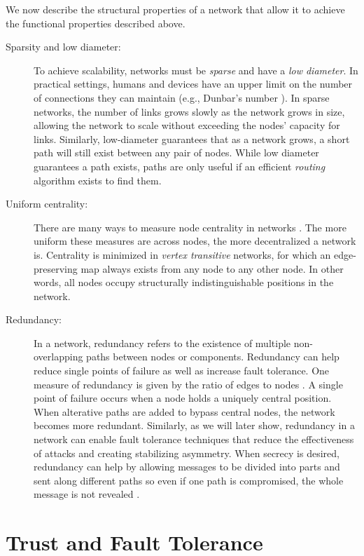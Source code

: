\documentclass{sig-alternate-05-2015}
\begin{document}
We now describe the structural properties of a network that allow it to achieve the functional properties described above. 
\begin{description}
\item [Sparsity and low diameter:]
To achieve scalability, networks must be {\em sparse} and have a
{\em low diameter}.
In practical settings, humans and devices have an upper limit on the number
of connections they can maintain (e.g., Dunbar's number
\cite{dunbar_neocortex_1992}).
In sparse networks, the number of links grows slowly as the network grows in
size, allowing the network to scale without exceeding the nodes' capacity for
links.
Similarly, low-diameter guarantees that as a network grows, a short path will
still exist between any pair of nodes.
While low diameter guarantees a path exists,
paths are only useful if an efficient {\em routing} algorithm exists
to find them.

\item [Uniform centrality:]
There are many ways to measure node centrality in networks
\cite{freeman_centrality_1978}.
The more uniform these measures are across nodes, the more decentralized
a network is.
Centrality is minimized in {\em vertex transitive} networks,
for which an edge-preserving map
always exists from any node to any other node.
In other words, all nodes occupy structurally indistinguishable positions
in the network.

\item [Redundancy:]
In a network, redundancy refers to the existence of multiple non-overlapping
paths between nodes or components.
Redundancy can help reduce single points of failure as well as
increase fault tolerance.
One measure of redundancy is given by the ratio of edges to nodes
\cite{baran_distributed_1964}.
A single point of failure occurs when a node holds a uniquely
central position.
When alterative paths are added to bypass central nodes,
the network becomes more redundant.
Similarly, as we will later show,
redundancy in a network can enable fault tolerance techniques
that reduce the effectiveness of attacks and creating stabilizing asymmetry.
When secrecy is desired, redundancy can help by allowing messages to be
divided into parts and sent along different paths so even if one path is
compromised, the whole message is not revealed
\cite{shamir_how_1979, blakley_safeguarding_1979}. 

\end{description}

\section{Trust and Fault Tolerance}
\end{document}
